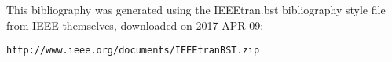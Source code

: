 \documentclass[a4paper,11pt]{article}
\begin{document}
This bibliography was generated using the IEEEtran.bst bibliography style file
from IEEE themselves, downloaded on 2017-APR-09:

\noindent\texttt{http://www.ieee.org/documents/IEEEtranBST.zip}

%

\nocite{*}


\end{document}
